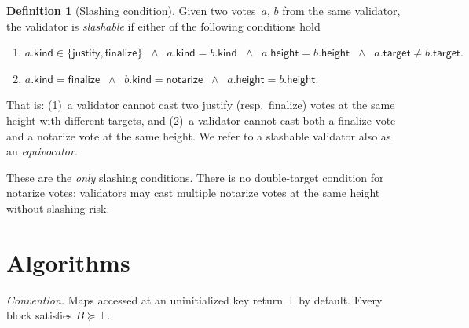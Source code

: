 \documentclass{article}
\newcommand{\target}{\mathsf{target}}
\newcommand{\kind}{\mathsf{kind}}
\newcommand{\height}{\mathsf{height}}
\newcommand{\finalize}{\mathsf{finalize}}
\newcommand{\justify}{\mathsf{justify}}
\newcommand{\notarize}{\mathsf{notarize}}
\theoremstyle{plain}
\theoremstyle{definition}
\newtheorem{definition}[theorem]{Definition}
\theoremstyle{remark}
\begin{document}
\begin{definition}[Slashing condition]\label{def:slashing}
Given two votes~$a$, $b$ from the same validator, the validator is \emph{slashable} if either of the following conditions hold
\begin{enumerate}
  \item \(
    a.\kind \in \{\justify,\finalize\}
    \;\;\wedge\;\;
    a.\kind = b.\kind
    \;\;\wedge\;\;
    a.\height = b.\height
    \;\;\wedge\;\;
    a.\target \neq b.\target.
  \)

  \item \(
    a.\kind = \finalize
    \;\;\wedge\;\;
    b.\kind = \notarize
    \;\;\wedge\;\;
    a.\height = b.\height.
  \)
\end{enumerate}

That is: (1)~a validator cannot cast two justify (resp.\ finalize) votes at the same height with different targets, and (2)~a validator cannot cast both a finalize vote and a notarize vote at the same height.
We refer to a slashable validator also as an \emph{equivocator}.

These are the \emph{only} slashing conditions.
There is no double-target condition for notarize votes: validators may cast multiple notarize votes at the same height without slashing risk.
\end{definition}

\section{Algorithms}

\emph{Convention.} Maps accessed at an uninitialized key return $\bot$ by default.
Every block satisfies $B \succeq \bot$.
\end{document}
